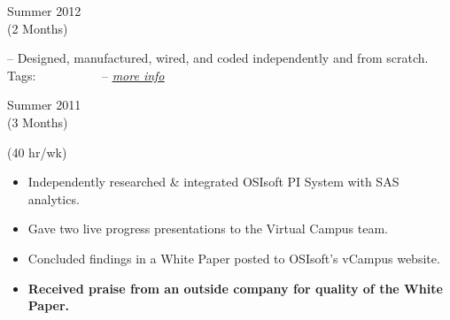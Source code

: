 \divLine

\flushleft \begin{minipage}[t]{\dateColWidth}
Summer 2012 \\
(2 Months)
\end{minipage}
\begin{minipage}[t]{0.8\textwidth}
	--
	Designed, manufactured, wired, and coded independently and from scratch.
	\\[0.2 em]
	Tags: 
	 \vline\ 
	 \vline\ 
	 \vline\ 
	 \vline\ 
	 \vline\ 
	 \vline\ 
	--
	\href{http://www.claytonketner.com/robotic-arm-mk2/}{\uline{\textit{more info}}}
\end{minipage}

\divLine

\flushleft \begin{minipage}[t]{\dateColWidth}
Summer 2011 \\
(3 Months)
\end{minipage}
\begin{minipage}[t]{0.8\textwidth}
 (40 hr/wk) \\[-1 em]
\begin{adjustwidth}{2.5 em}{0 em} 

\begin{itemize} \itemsep-2pt
\setlength{\itemindent}{-2 em}

\item Independently researched \& integrated OSIsoft PI System with SAS analytics.
\item Gave two live progress presentations to the Virtual Campus team.
\item Concluded findings in a White Paper posted to OSIsoft's vCampus website.
\item\textbf{Received praise from an outside company for quality of the White Paper.}
\end{itemize}

\end{adjustwidth}
\end{minipage}